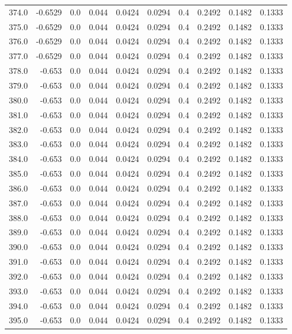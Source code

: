 \begin{longtable}{lrrrrrrrrr}
374.0 & -0.6529 & 0.0 & 0.044 & 0.0424 & 0.0294 & 0.4 & 0.2492 & 0.1482 & 0.1333 \\
375.0 & -0.6529 & 0.0 & 0.044 & 0.0424 & 0.0294 & 0.4 & 0.2492 & 0.1482 & 0.1333 \\
376.0 & -0.6529 & 0.0 & 0.044 & 0.0424 & 0.0294 & 0.4 & 0.2492 & 0.1482 & 0.1333 \\
377.0 & -0.6529 & 0.0 & 0.044 & 0.0424 & 0.0294 & 0.4 & 0.2492 & 0.1482 & 0.1333 \\
378.0 & -0.653 & 0.0 & 0.044 & 0.0424 & 0.0294 & 0.4 & 0.2492 & 0.1482 & 0.1333 \\
379.0 & -0.653 & 0.0 & 0.044 & 0.0424 & 0.0294 & 0.4 & 0.2492 & 0.1482 & 0.1333 \\
380.0 & -0.653 & 0.0 & 0.044 & 0.0424 & 0.0294 & 0.4 & 0.2492 & 0.1482 & 0.1333 \\
381.0 & -0.653 & 0.0 & 0.044 & 0.0424 & 0.0294 & 0.4 & 0.2492 & 0.1482 & 0.1333 \\
382.0 & -0.653 & 0.0 & 0.044 & 0.0424 & 0.0294 & 0.4 & 0.2492 & 0.1482 & 0.1333 \\
383.0 & -0.653 & 0.0 & 0.044 & 0.0424 & 0.0294 & 0.4 & 0.2492 & 0.1482 & 0.1333 \\
384.0 & -0.653 & 0.0 & 0.044 & 0.0424 & 0.0294 & 0.4 & 0.2492 & 0.1482 & 0.1333 \\
385.0 & -0.653 & 0.0 & 0.044 & 0.0424 & 0.0294 & 0.4 & 0.2492 & 0.1482 & 0.1333 \\
386.0 & -0.653 & 0.0 & 0.044 & 0.0424 & 0.0294 & 0.4 & 0.2492 & 0.1482 & 0.1333 \\
387.0 & -0.653 & 0.0 & 0.044 & 0.0424 & 0.0294 & 0.4 & 0.2492 & 0.1482 & 0.1333 \\
388.0 & -0.653 & 0.0 & 0.044 & 0.0424 & 0.0294 & 0.4 & 0.2492 & 0.1482 & 0.1333 \\
389.0 & -0.653 & 0.0 & 0.044 & 0.0424 & 0.0294 & 0.4 & 0.2492 & 0.1482 & 0.1333 \\
390.0 & -0.653 & 0.0 & 0.044 & 0.0424 & 0.0294 & 0.4 & 0.2492 & 0.1482 & 0.1333 \\
391.0 & -0.653 & 0.0 & 0.044 & 0.0424 & 0.0294 & 0.4 & 0.2492 & 0.1482 & 0.1333 \\
392.0 & -0.653 & 0.0 & 0.044 & 0.0424 & 0.0294 & 0.4 & 0.2492 & 0.1482 & 0.1333 \\
393.0 & -0.653 & 0.0 & 0.044 & 0.0424 & 0.0294 & 0.4 & 0.2492 & 0.1482 & 0.1333 \\
394.0 & -0.653 & 0.0 & 0.044 & 0.0424 & 0.0294 & 0.4 & 0.2492 & 0.1482 & 0.1333 \\
395.0 & -0.653 & 0.0 & 0.044 & 0.0424 & 0.0294 & 0.4 & 0.2492 & 0.1482 & 0.1333 \\

\end{longtable}
